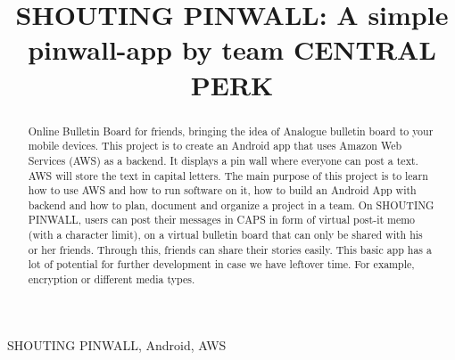 \documentclass[conference]{IEEEtran}
\numberwithin{figure}{subsection}
\begin{document}
\title{SHOUTING PINWALL: A simple pinwall-app by team CENTRAL PERK\\}

\author{
\and

\and

\and

}

\maketitle

\begin{abstract}
Online Bulletin Board for friends, bringing the idea of Analogue bulletin board to your mobile devices. This project is to create an Android app that uses Amazon Web Services (AWS) as a backend. It displays a pin wall where everyone can post a text. AWS will store the text in capital letters. The main purpose of this project is to learn how to use AWS and how to run software on it, how to build an Android App with backend and how to plan, document and organize a project in a team. On SHOUTING PINWALL, users can post their messages in CAPS in form of virtual post-it memo (with a character limit), on a virtual bulletin board that can only be shared with his or her friends. Through this, friends can share their stories easily. This basic app has a lot of potential for further development in case we have leftover time. For example, encryption or different media types.
 
\end{abstract}
\begin{IEEEkeywords}
SHOUTING PINWALL, Android, AWS\\
\end{IEEEkeywords}
\end{document}
